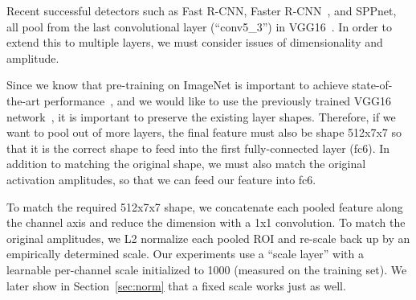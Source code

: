 \documentclass[10pt,twocolumn,letterpaper]{article}
\begin{document}

Recent successful detectors such as Fast R-CNN, Faster
R-CNN~\cite{ren2015faster}, and SPPnet, all pool from the last convolutional
layer (``conv5\_3'') in VGG16~\cite{simonyan2015verydeep}.  In order to extend
this to multiple layers, we must consider issues of dimensionality and
amplitude.

Since we know that pre-training on ImageNet is important to achieve
state-of-the-art performance~\cite{agrawal14analyzing}, and we would like to use
the previously trained VGG16 network~\cite{simonyan2015verydeep}, it is
important to preserve the existing layer shapes.  Therefore, if we want to pool
out of more layers, the final feature must also be shape 512x7x7 so that it is
the correct shape to feed into the first fully-connected layer (fc6).  In
addition to matching the original shape, we must also match the original
activation amplitudes, so that we can feed our feature into fc6.

To match the required 512x7x7 shape, we concatenate each pooled feature along
the channel axis and reduce the dimension with a 1x1 convolution.  To match the
original amplitudes, we L2 normalize each pooled ROI and re-scale back up by an
empirically determined scale.  Our experiments use a ``scale layer'' with a
learnable per-channel scale initialized to 1000 (measured on the training set).
We later show in Section~\ref{sec:norm} that a fixed scale works just as well.
\end{document}
